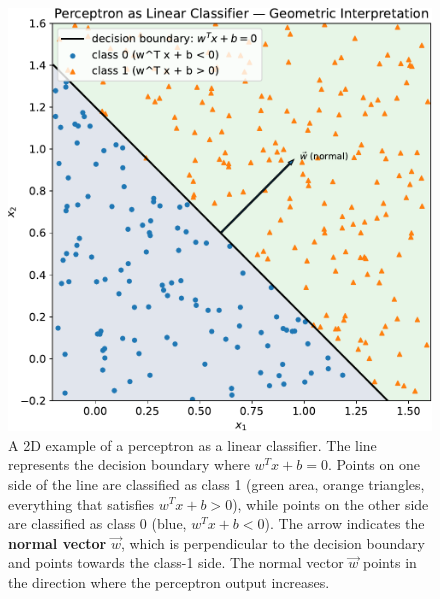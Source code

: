 \begin{figure}[!htp]
    \centering
    \includegraphics[width=.9\textwidth]{img/perceptron/perceptron-linear-classifier.pdf}
    \caption{A 2D example of a perceptron as a linear classifier. The line represents the decision boundary where $w^{T} x + b = 0$. Points on one side of the line are classified as class 1 (green area, orange triangles, everything that satisfies $w^{T} x + b > 0$), while points on the other side are classified as class 0 (blue, $w^{T} x + b < 0$). The arrow indicates the \textbf{normal vector} $\vec{w}$, which is perpendicular to the decision boundary and points towards the class-1 side. The normal vector $\vec{w}$ points in the direction where the perceptron output increases.}
    \label{fig:perceptron-linear-classifier}
\end{figure}

